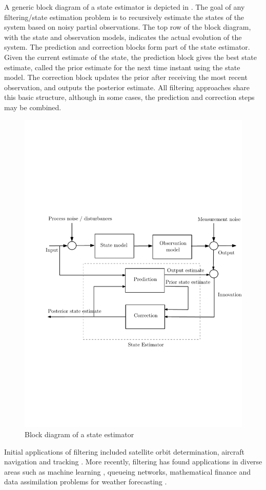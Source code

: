 A generic block diagram of a state estimator is depicted in . The goal of any filtering/state estimation problem is to recursively estimate the states of the system based on noisy partial observations. The top row of the block diagram, with the state and observation models, indicates the actual evolution of the system. The prediction and correction blocks form part of the state estimator. Given the current estimate of the state, the prediction block gives the best state estimate, called the prior estimate for the next time instant using the state model. The correction block updates the prior after receiving the most recent observation, and outputs the posterior estimate. All filtering approaches share this basic structure, although in some cases, the prediction and correction steps may be combined.  

\begin{figure}
	\includegraphics[width=7in]{images/Chap1_state_est_block}
	\caption{Block diagram of a state estimator}
	\label{Fig:state_estimator}
\end{figure} 
Initial applications of filtering included satellite orbit determination, aircraft navigation and tracking \cite{kutsurpfi19}. More recently, filtering has found applications in diverse areas such as machine learning \cite{bishop06}, queueing networks, mathematical finance \cite{brihan08} and data assimilation problems for weather forecasting \cite{eve94}. 


